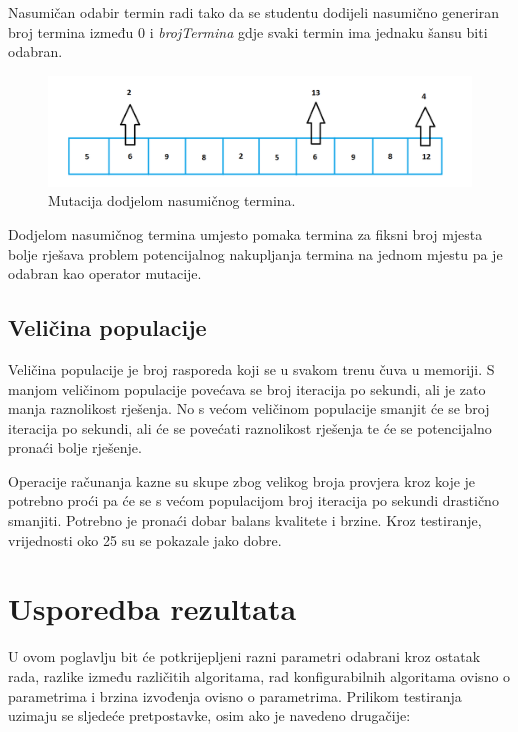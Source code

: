 \documentclass[times, utf8, zavrsni]{fer}
\begin{document}
Nasumičan odabir termin radi tako da se studentu dodijeli nasumično generiran broj termina između 0 i \emph{brojTermina} gdje svaki termin ima jednaku šansu biti odabran.

\begin{figure}[htb]
\centering
\includegraphics[width=15cm]{images/mut_rand.png}
\caption{Mutacija dodjelom nasumičnog termina.}
\label{fig:mut_rand}
\end{figure}

Dodjelom nasumičnog termina umjesto pomaka termina za fiksni broj mjesta bolje rješava problem potencijalnog nakupljanja termina na jednom mjestu pa je odabran kao operator mutacije.

\section{Veličina populacije}

Veličina populacije je broj rasporeda koji se u svakom trenu čuva u memoriji. S manjom veličinom populacije povećava se broj iteracija po sekundi, ali je zato manja raznolikost rješenja. No s većom veličinom populacije smanjit će se broj iteracija po sekundi, ali će se povećati raznolikost rješenja te će se potencijalno pronaći bolje rješenje.

Operacije računanja kazne su skupe zbog velikog broja provjera kroz koje je potrebno proći pa će se s većom populacijom broj iteracija po sekundi drastično smanjiti. Potrebno je pronaći dobar balans kvalitete i brzine. Kroz testiranje, vrijednosti oko 25 su se pokazale jako dobre.

\chapter{Usporedba rezultata}

U ovom poglavlju bit će potkrijepljeni razni parametri odabrani kroz ostatak rada, razlike između različitih algoritama, rad konfigurabilnih algoritama ovisno o parametrima i brzina izvođenja ovisno o parametrima. Prilikom testiranja uzimaju se sljedeće pretpostavke, osim ako je navedeno drugačije:
\end{document}
